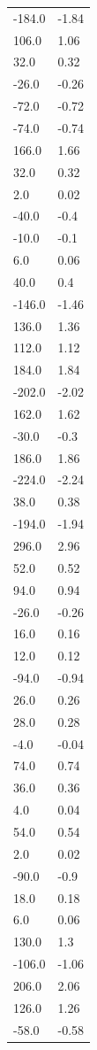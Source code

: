 \begin{longtable}{ll}
-184.0 & -1.84 \\
106.0 & 1.06 \\
32.0 & 0.32 \\
-26.0 & -0.26 \\
-72.0 & -0.72 \\
-74.0 & -0.74 \\
166.0 & 1.66 \\
32.0 & 0.32 \\
2.0 & 0.02 \\
-40.0 & -0.4 \\
-10.0 & -0.1 \\
6.0 & 0.06 \\
40.0 & 0.4 \\
-146.0 & -1.46 \\
136.0 & 1.36 \\
112.0 & 1.12 \\
184.0 & 1.84 \\
-202.0 & -2.02 \\
162.0 & 1.62 \\
-30.0 & -0.3 \\
186.0 & 1.86 \\
-224.0 & -2.24 \\
38.0 & 0.38 \\
-194.0 & -1.94 \\
296.0 & 2.96 \\
52.0 & 0.52 \\
94.0 & 0.94 \\
-26.0 & -0.26 \\
16.0 & 0.16 \\
12.0 & 0.12 \\
-94.0 & -0.94 \\
26.0 & 0.26 \\
28.0 & 0.28 \\
-4.0 & -0.04 \\
74.0 & 0.74 \\
36.0 & 0.36 \\
4.0 & 0.04 \\
54.0 & 0.54 \\
2.0 & 0.02 \\
-90.0 & -0.9 \\
18.0 & 0.18 \\
6.0 & 0.06 \\
130.0 & 1.3 \\
-106.0 & -1.06 \\
206.0 & 2.06 \\
126.0 & 1.26 \\
-58.0 & -0.58 \\

\end{longtable}
